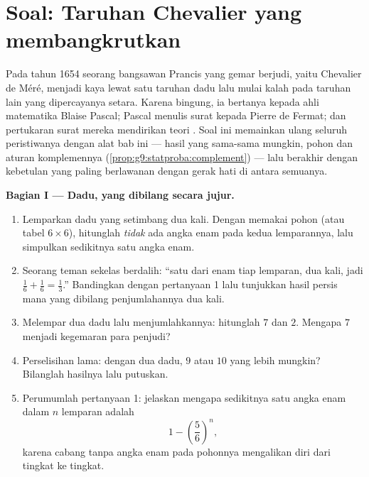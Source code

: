 \section{Soal: Taruhan Chevalier yang membangkrutkan}

\begin{problem}
\label{pb:g9:statproba:1}
Pada tahun 1654 seorang bangsawan Prancis yang gemar berjudi, yaitu
Chevalier de Méré, menjadi kaya lewat satu taruhan dadu lalu mulai
kalah pada taruhan lain yang dipercayanya setara. Karena bingung, ia
bertanya kepada ahli matematika Blaise Pascal; Pascal menulis surat
kepada Pierre de Fermat; dan pertukaran surat mereka mendirikan teori
. Soal ini memainkan ulang seluruh peristiwanya dengan alat bab
ini --- hasil yang sama-sama mungkin, pohon dan aturan komplemennya
(\cref{prop:g9:statproba:complement}) --- lalu berakhir dengan
kebetulan yang paling berlawanan dengan gerak hati di antara semuanya.

\medskip
\noindent\textbf{Bagian I --- Dadu, yang dibilang secara jujur.}
\begin{enumerate}
  \item Lemparkan dadu yang setimbang dua kali. Dengan memakai pohon
        (atau tabel $6 \times 6$), hitunglah  \emph{tidak} ada
        angka enam pada kedua lemparannya, lalu simpulkan 
        sedikitnya satu angka enam.
  \item Seorang teman sekelas berdalih: ``satu  dari enam tiap
        lemparan, dua kali, jadi $\frac16 + \frac16 = \frac13$.''
        Bandingkan dengan pertanyaan 1 lalu tunjukkan hasil persis
        mana yang dibilang penjumlahannya
        dua kali.
  \item Melempar dua dadu lalu menjumlahkannya: hitunglah 
         $7$ dan   $2$. Mengapa $7$ menjadi
        kegemaran para penjudi?
  \item Perselisihan lama: dengan dua dadu,  $9$ atau 
        $10$ yang lebih mungkin? Bilanglah hasilnya lalu putuskan.
  \item Perumumlah pertanyaan 1: jelaskan mengapa  sedikitnya
        satu angka enam dalam $n$ lemparan adalah
        \[
        1 - \left(\frac56\right)^{\!n} ,
        \]
        karena cabang tanpa angka enam pada pohonnya mengalikan diri
        dari tingkat ke tingkat.
\end{enumerate}


\end{problem}
